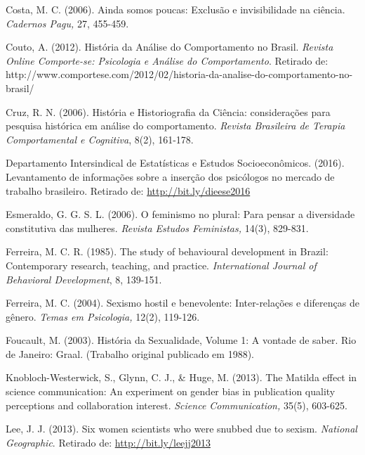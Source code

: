 \hangindent=25pt
\noindent Costa, M. C. (2006). Ainda somos poucas: Exclusão e invisibilidade na ciência. \textit{Cadernos Pagu,} 27, 455-459.
 
\hangindent=25pt
\noindent Couto, A. (2012). História da Análise do Comportamento no Brasil. \textit{Revista Online Comporte-se: Psicologia e Análise do Comportamento}.  Retirado de: http://www.comportese.com/2012/02/historia-da-analise-do-comportamento-no-brasil/

\hangindent=25pt
\noindent Cruz, R. N. (2006). História e Historiografia da Ciência: considerações para pesquisa histórica em análise do comportamento. \textit{Revista Brasileira de Terapia Comportamental e Cognitiva}, 8(2), 161-178. 

\hangindent=25pt
\noindent Departamento Intersindical de Estatísticas e Estudos Socioeconômicos. (2016). Levantamento de informações sobre a inserção dos psicólogos no mercado de trabalho brasileiro. Retirado de: \url{http://bit.ly/dieese2016}

\hangindent=25pt
\noindent Esmeraldo, G. G. S. L. (2006). O feminismo no plural: Para pensar a diversidade constitutiva das mulheres.\textit{ Revista Estudos Feministas,} 14(3), 829-831.

\hangindent=25pt
\noindent Ferreira, M. C. R. (1985). The study of behavioural development in Brazil: Contemporary research, teaching, and practice. \textit{International Journal of Behavioral Development}, 8, 139-151.

\hangindent=25pt
\noindent Ferreira, M. C. (2004). Sexismo hostil e benevolente: Inter-relações e diferenças de gênero. \textit{Temas em Psicologia,} 12(2), 119-126.

\hangindent=25pt
\noindent Foucault, M. (2003). História da Sexualidade, Volume 1: A vontade de saber. Rio de Janeiro: Graal. (Trabalho original publicado em 1988).

\hangindent=25pt
\noindent Knobloch-Westerwick, S., Glynn, C. J., \& Huge, M. (2013). The Matilda effect in science communication: An experiment on gender bias in publication quality perceptions and collaboration interest. \textit{Science Communication,} 35(5), 603-625.

\hangindent=25pt
\noindent Lee, J. J. (2013). Six women scientists who were snubbed due to sexism. \textit{National Geographic}. Retirado de: \url{http://bit.ly/leejj2013}

